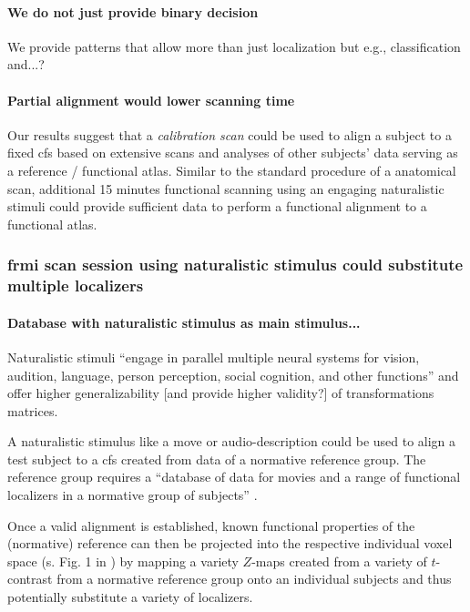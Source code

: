 \paragraph{We do not just provide binary decision}


%
We provide patterns that allow more than just localization but e.g.,
classification and...?


\paragraph{Partial alignment would lower scanning time}
%
Our results suggest that a \textit{calibration scan} could be used to align a
subject to a fixed \ac{cfs} based on extensive scans and analyses of other
subjects' data serving as a reference / functional atlas.
%
Similar to the standard procedure of a anatomical scan, additional 15 minutes
functional scanning using an engaging naturalistic stimuli could provide
sufficient data to perform a functional alignment to a functional atlas.



\subsubsection{\ac{frmi} scan session using naturalistic stimulus could
substitute multiple localizers}


\paragraph{Database with naturalistic stimulus as main stimulus...}
%
Naturalistic stimuli ``engage in parallel multiple neural systems for vision,
audition, language, person perception, social cognition, and other functions''
\citep{jiahui2020predicting} and offer higher generalizability [and provide
higher validity?] of transformations matrices.

%
A naturalistic stimulus like a move or audio-description could be used to align
a test subject to a \ac{cfs} created from data of a normative reference group.
%
The reference group requires a ``database of data for movies and a range of
functional localizers in a normative group of subjects''
\citep{jiahui2020predicting}.

%
Once a valid alignment is established, known functional properties of the
(normative) reference can then be projected into the respective individual voxel
space (s. Fig. 1 in \citep{nishimoto2016lining}) by mapping a variety $Z$-maps
created from a variety of $t$-contrast from a normative reference group onto an
individual subjects and thus potentially substitute a variety of localizers.

